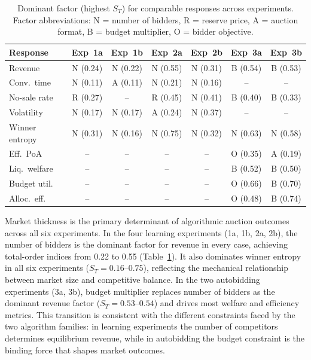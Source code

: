 \begin{table}[H]
\centering
\caption{Dominant factor (highest $S_T$) for comparable responses across experiments. Factor abbreviations: N = number of bidders, R = reserve price, A = auction format, B = budget multiplier, O = bidder objective.}
\label{tab:sens_dominant}
\small
\setlength{\tabcolsep}{4pt}
\begin{tabular}{l cccccc}
\toprule
Response & Exp~1a & Exp~1b & Exp~2a & Exp~2b & Exp~3a & Exp~3b \\
\midrule
Revenue        & N (0.24) & N (0.22) & N (0.55) & N (0.31) & B (0.54) & B (0.53) \\
Conv.\ time    & N (0.11) & A (0.11) & N (0.21) & N (0.16) & -- & -- \\
No-sale rate   & R (0.27) & -- & R (0.45) & N (0.41) & B (0.40) & B (0.33) \\
Volatility     & N (0.17) & N (0.17) & A (0.24) & N (0.37) & -- & -- \\
Winner entropy & N (0.31) & N (0.16) & N (0.75) & N (0.32) & N (0.63) & N (0.58) \\
\midrule
Eff.\ PoA      & -- & -- & -- & -- & O (0.35) & A (0.19) \\
Liq.\ welfare  & -- & -- & -- & -- & B (0.52) & B (0.50) \\
Budget util.   & -- & -- & -- & -- & O (0.66) & B (0.70) \\
Alloc.\ eff.   & -- & -- & -- & -- & O (0.48) & B (0.74) \\
\bottomrule
\end{tabular}
\end{table}

Market thickness is the primary determinant of algorithmic auction outcomes across all six experiments. In the four learning experiments (1a, 1b, 2a, 2b), the number of bidders is the dominant factor for revenue in every case, achieving total-order indices from 0.22 to 0.55 (Table~\ref{tab:sens_dominant}). It also dominates winner entropy in all six experiments ($S_T = 0.16$--$0.75$), reflecting the mechanical relationship between market size and competitive balance. In the two autobidding experiments (3a, 3b), budget multiplier replaces number of bidders as the dominant revenue factor ($S_T = 0.53$--$0.54$) and drives most welfare and efficiency metrics. This transition is consistent with the different constraints faced by the two algorithm families: in learning experiments the number of competitors determines equilibrium revenue, while in autobidding the budget constraint is the binding force that shapes market outcomes.

